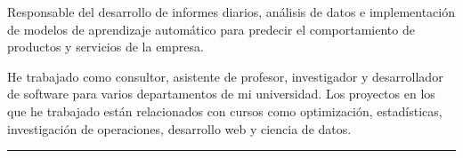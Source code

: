 \documentclass[]{rahulworld-resume}
\begin{document}
\begin{minipage}[t]{0.66\textwidth}
\begin{minipage}{0.85\textwidth\vspace{2pt}}
    \end{minipage}

    \noindent
    \hspace{5em}%
    \begin{minipage}{0.85\textwidth\vspace{2pt}} Responsable del desarrollo de
        informes diarios, análisis de datos e implementación de modelos de aprendizaje
        automático para predecir el comportamiento de productos y servicios de la empresa.
    \end{minipage}
    \sectionsep


    \noindent
    \hspace{5em}%
    \begin{minipage}{0.85\textwidth\vspace{2pt}} He trabajado como
        consultor, asistente de profesor, investigador y desarrollador de software para varios
        departamentos de mi universidad. Los proyectos en los que he trabajado están
        relacionados con cursos como optimización, estadísticas, investigación de operaciones,
        desarrollo web y ciencia de datos.
    \end{minipage}
    \noindent\rule{12.5cm}{0.4pt}
    \sectionsep






\end{minipage}
\end{document}

